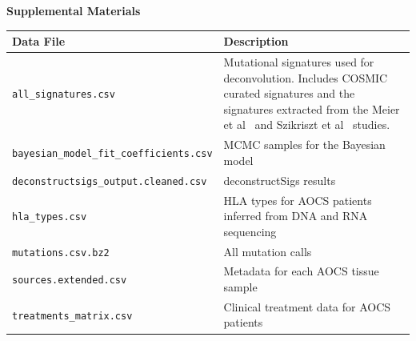 
\pagebreak
\begin{center}
\textbf{\large Supplemental Materials}
\end{center}

\setcounter{equation}{0}
\setcounter{figure}{0}
\setcounter{table}{0}
\makeatletter
\renewcommand{\theequation}{S\arabic{equation}}
\renewcommand{\thefigure}{S\arabic{figure}}

\begin{center}
    \begin{tabular}{ | l | p{8cm} |}
    \hline
    Data File & Description \\ \hline
    \texttt{all\_signatures.csv} & Mutational signatures used for deconvolution. Includes COSMIC curated signatures and the signatures extracted from the Meier et al~\cite{Meier_2014} and Szikriszt et al~\cite{Szikriszt_2016} studies. \\ \hline
    \texttt{bayesian\_model\_fit\_coefficients.csv} & MCMC samples for the Bayesian model \\ \hline
    \texttt{deconstructsigs\_output.cleaned.csv} & deconstructSigs results \\ \hline
    \texttt{hla\_types.csv} & HLA types for AOCS patients inferred from DNA and RNA sequencing \\ \hline
    \texttt{mutations.csv.bz2} & All mutation calls \\ \hline
    \texttt{sources.extended.csv} & Metadata for each AOCS tissue sample \\ \hline
    \texttt{treatments\_matrix.csv} & Clinical treatment data for AOCS patients \\ \hline
    \end{tabular}
\end{center}

